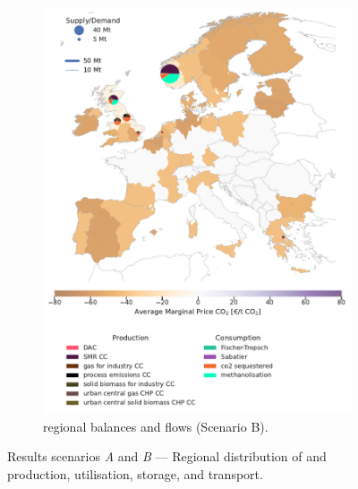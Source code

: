 \documentclass[preprint,12pt]{elsarticle}
\begin{document}
\begin{figure}[!htbp]
\begin{subfigure}[t]{0.47\textwidth}
      \includegraphics[width=\textwidth]{balance_map_co2_scenario_b}
      \vspace{-0.7cm}
      \caption{ regional balances and flows (Scenario B).}
      \label{fig:balance_map_co2_scenario_b}
  \end{subfigure}

  \caption{Results scenarios \textit{A} and \textit{B} --- Regional distribution of  and  production, utilisation, storage, and transport.}
  \label{fig:balance_maps_scenarios_a_b}
\end{figure}

\newpage
 

\end{document}
